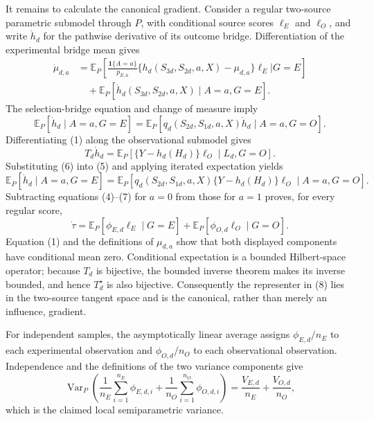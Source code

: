 It remains to calculate the canonical gradient.  Consider a regular two-source parametric submodel through \(P\), with conditional source scores \(\ell_E\) and \(\ell_O\), and write \(\dot h_d\) for the pathwise derivative of its outcome bridge.  Differentiation of the experimental bridge mean gives
\[
\begin{aligned}
 \dot\mu_{d,a}
 &=\mathbb E_P\!\left[
   \frac{\mathbf 1\{A=a\}}{p_{E,a}}
   \{h_d(S_{3d},S_{2d},a,X)-\mu_{d,a}\}\ell_E
   \mathrel{\Big|}G=E\right]\\
 &\quad+\mathbb E_P[\dot h_d(S_{3d},S_{2d},a,X)\mid A=a,G=E].
\end{aligned} \tag{4}
\]
The selection-bridge equation and change of measure imply
\[
 \mathbb E_P[\dot h_d\mid A=a,G=E]
 =\mathbb E_P[q_d(S_{2d},S_{1d},a,X)\dot h_d\mid A=a,G=O]. \tag{5}
\]
Differentiating (1) along the observational submodel gives
\[
 T_d\dot h_d
 =\mathbb E_P[\{Y-h_d(H_d)\}\ell_O\mid L_d,G=O]. \tag{6}
\]
Substituting (6) into (5) and applying iterated expectation yields
\[
 \mathbb E_P[\dot h_d\mid A=a,G=E]
 =\mathbb E_P[q_d(S_{2d},S_{1d},a,X)\{Y-h_d(H_d)\}\ell_O
   \mid A=a,G=O]. \tag{7}
\]
Subtracting equations (4)--(7) for \(a=0\) from those for \(a=1\) proves, for every regular score,
\[
 \dot\tau
 =\mathbb E_P[\phi_{E,d}\ell_E\mid G=E]
  +\mathbb E_P[\phi_{O,d}\ell_O\mid G=O]. \tag{8}
\]
Equation (1) and the definitions of \(\mu_{d,a}\) show that both displayed components have conditional mean zero.  Conditional expectation is a bounded Hilbert-space operator; because \(T_d\) is bijective, the bounded inverse theorem makes its inverse bounded, and hence \(T_d^\star\) is also bijective.  Consequently the representer in (8) lies in the two-source tangent space and is the canonical, rather than merely an influence, gradient.

For independent samples, the asymptotically linear average assigns \(\phi_{E,d}/n_E\) to each experimental observation and \(\phi_{O,d}/n_O\) to each observational observation.  Independence and the definitions of the two variance components give
\[
 \operatorname{Var}_P\!\left(
  \frac1{n_E}\sum_{i=1}^{n_E}\phi_{E,d,i}
 +\frac1{n_O}\sum_{i=1}^{n_O}\phi_{O,d,i}\right)
 =\frac{V_{E,d}}{n_E}+\frac{V_{O,d}}{n_O},
\]
which is the claimed local semiparametric variance.